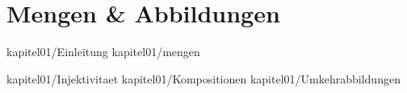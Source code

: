 
\chapter{Mengen \& Abbildungen}
 {kapitel01/Einleitung}
 {kapitel01/mengen}

 {kapitel01/Injektivitaet}
 {kapitel01/Kompositionen}
 {kapitel01/Umkehrabbildungen}








